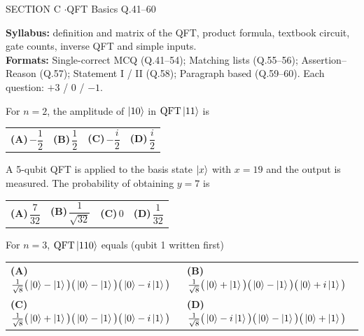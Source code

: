 \documentclass[11pt,a4paper]{article}
\newcommand{\optlabel}[1]{\textbf{(#1)}}
\newenvironment{qitem}[1]{\begin{list}{}{\setlength{\leftmargin}{3.3em}\setlength{\labelwidth}{3.1em}%
  \setlength{\labelsep}{0.2em}\setlength{\topsep}{3pt}\setlength{\parsep}{3pt}}\item[\textbf{Q.#1}\hfill]}{\end{list}}
\newcommand{\qsep}{\par\vspace{2pt}{\color{black!15}\hrule}\vspace{4pt}}
\begin{document}
\newpage

\begin{sectionbanner}SECTION C \enspace$\cdot$\enspace QFT Basics \hfill Q.41--60\end{sectionbanner}

{\small \textbf{Syllabus:} definition and matrix of the QFT, product formula, textbook circuit, gate counts, inverse QFT and simple inputs.\\ \textbf{Formats:} Single-correct MCQ (Q.41--54); Matching lists (Q.55--56); Assertion--Reason (Q.57); Statement I / II (Q.58); Paragraph based (Q.59--60). Each question: $+3$ / $0$ / $-1$.}
\par\medskip

\begin{qitem}{41}
For $n = 2$, the amplitude of $\ket{10}$ in $\mathrm{QFT}\ket{11}$ is
\par\smallskip\noindent\begin{tabularx}{\linewidth}{@{}*{4}{L}@{}}
\optlabel{A}\,$-\dfrac12$ & \optlabel{B}\,$\dfrac12$ & \optlabel{C}\,$-\dfrac{i}{2}$ & \optlabel{D}\,$\dfrac{i}{2}$
\end{tabularx}
\end{qitem}
\qsep

\begin{qitem}{42}
A 5-qubit QFT is applied to the basis state $\ket{x}$ with $x = 19$ and the output is measured. The probability of
obtaining $y = 7$ is
\par\smallskip\noindent\begin{tabularx}{\linewidth}{@{}*{4}{L}@{}}
\optlabel{A}\,$\dfrac{7}{32}$ & \optlabel{B}\,$\dfrac{1}{\sqrt{32}}$ & \optlabel{C}\,$0$ & \optlabel{D}\,$\dfrac{1}{32}$
\end{tabularx}
\end{qitem}
\qsep

\begin{qitem}{43}
For $n = 3$, $\mathrm{QFT}\ket{110}$ equals (qubit 1 written first)
\par\smallskip\noindent\begin{tabularx}{\linewidth}{@{}*{2}{L}@{}}
\optlabel{A}\,$\frac{1}{\sqrt8}\big(\ket0 - \ket1\big)\big(\ket0 - \ket1\big)\big(\ket0 - i\ket1\big)$ & \optlabel{B}\,$\frac{1}{\sqrt8}\big(\ket0 + \ket1\big)\big(\ket0 - \ket1\big)\big(\ket0 + i\ket1\big)$ \\[3pt]
\optlabel{C}\,$\frac{1}{\sqrt8}\big(\ket0 + \ket1\big)\big(\ket0 - \ket1\big)\big(\ket0 - i\ket1\big)$ & \optlabel{D}\,$\frac{1}{\sqrt8}\big(\ket0 - i\ket1\big)\big(\ket0 - \ket1\big)\big(\ket0 + \ket1\big)$
\end{tabularx}
\end{qitem}
\qsep
\end{document}
